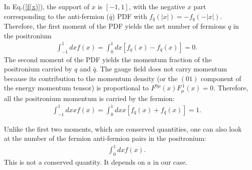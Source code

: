 \documentclass[aps,prd,twocolumn,tightenlines,superscriptaddress,
nofootinbib,preprintnumbers]{revtex4-1}
\newcommand{\Blue}[1]{\textcolor{black}{#1}}
\begin{document}
In Eq.(\ref{f(x)}), the support of $x$ is $[-1,1]$, 
with the negative $x$ part corresponding to the anti-fermion ($\bar{q}$) PDF with $f_{\bar{q}}(|x|) = -f_q(-|x|)$.
Therefore, the first moment of the PDF yields the net number of fermions $q$ in the positronium
\begin{eqnarray}
   \int_{-1}^{1}dx f(x) =\int_{0}^{1} dx[f_q(x)-f_{\bar{q}}(x)]= 0 .
\end{eqnarray}
The second moment of the PDF yields the momentum fraction of the positronium carried by $q$ and $\bar q$. The gauge field does not carry momentum because its contribution to the momentum density (or the $(01)$ component of the energy momentum tensor) is proportional to $F^{0\mu}(x)F^{\ 1}_{\mu}(x)=0$. Therefore, all the positronium momentum is carried by the fermion: 
\begin{eqnarray}
\label{<x>}
   \int_{-1}^{1}dx x f(x) =\int_{0}^{1} dx x[f_q(x)+f_{\bar{q}}(x)]= 1.
\end{eqnarray}


 
Unlike the first two moments, which are conserved quantities, one can also look at the number of the fermion anti-fermion pairs in the positronium:
\begin{eqnarray}
   \int_{0}^{1}dx f(x) .
\end{eqnarray}
This is not a conserved quantity. It depends on $a$ in our case. 

\end{document}
